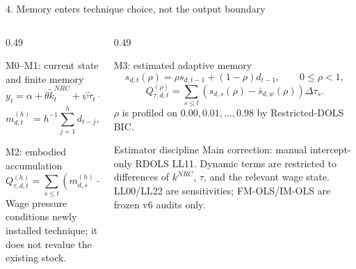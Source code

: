 \documentclass[10pt,aspectratio=169]{beamer}
\begin{document}
\begin{frame}{4. Memory enters technique choice, not the output boundary}
  \begin{columns}[T,onlytextwidth]
    \begin{column}{0.49\textwidth}
      \begin{block}{M0--M1: current state and finite memory}
        \small
        \[
        y_t=\alpha+\theta\widetilde k_t^{NRC}+\psi\widetilde\tau_t
        +\phi\widetilde d_t+\lambda(\widetilde\tau_t\widetilde d_t)+\varepsilon_t,
        \]
        \[
        m_{d,t}^{(h)}=h^{-1}\sum_{j=1}^{h}d_{t-j},\qquad h\in\{3,5\}.
        \]
      \end{block}
      \begin{block}{M2: embodied accumulation}
        \small
        \[
        Q_{\tau,d,t}^{(h)}=\sum_{s\le t}
        (m_{d,s}^{(h)}-\bar m_{d,w}^{(h)})\Delta\tau_s.
        \]
        Wage pressure conditions newly installed technique; it does not revalue the existing stock.
      \end{block}
    \end{column}
    \begin{column}{0.49\textwidth}
      \begin{block}{M3: estimated adaptive memory}
        \small
        \[
          s_{d,t}(\rho)=\rho s_{d,t-1}+(1-\rho)d_{t-1},
          \qquad 0\leq\rho<1,
        \]
        \[
          Q_{\tau,d,t}^{(\rho)}=\sum_{s\le t}
          (s_{d,s}(\rho)-\bar s_{d,w}(\rho))\Delta\tau_s.
        \]
        $\rho$ is profiled on $0.00,0.01,\ldots,0.98$ by Restricted-DOLS BIC.
      \end{block}
      \begin{alertblock}{Estimator discipline}
        \small
        Main correction: manual intercept-only RDOLS LL11. Dynamic terms are restricted to differences of $k^{NRC}$, $\tau$, and the relevant wage state. LL00/LL22 are sensitivities; FM-OLS/IM-OLS are frozen v6 audits only.
      \end{alertblock}
    \end{column}
  \end{columns}
\end{frame}
\end{document}
